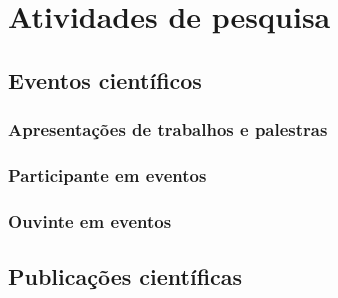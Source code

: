 
\chapter{Atividades de pesquisa}\label{cap:pesquisa}

\section{Eventos científicos} \label{sec:eventosCientificos}

\subsection{Apresentações de trabalhos e palestras}



\subsection{Participante em eventos}



\subsection{Ouvinte em eventos}






\section{Publicações científicas}


